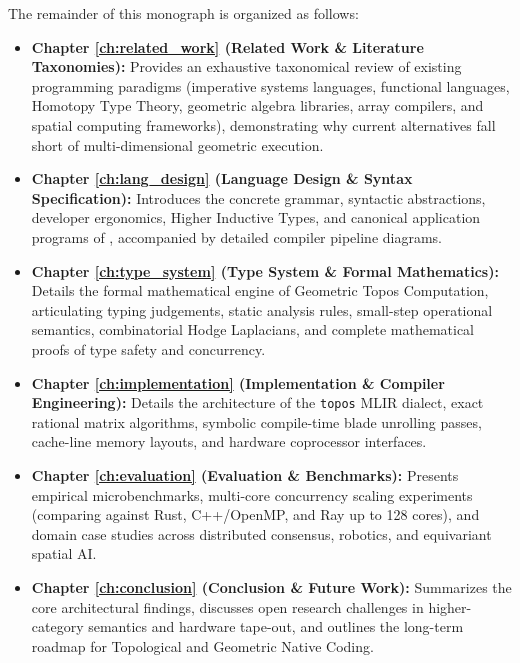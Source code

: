 The remainder of this monograph is organized as follows:
\begin{itemize}[leftmargin=1.5cm]
    \item \textbf{Chapter \ref{ch:related_work} (Related Work \& Literature Taxonomies):} Provides an exhaustive taxonomical review of existing programming paradigms (imperative systems languages, functional languages, Homotopy Type Theory, geometric algebra libraries, array compilers, and spatial computing frameworks), demonstrating why current alternatives fall short of multi-dimensional geometric execution.
    \item \textbf{Chapter \ref{ch:lang_design} (Language Design \& Syntax Specification):} Introduces the concrete grammar, syntactic abstractions, developer ergonomics, Higher Inductive Types, and canonical application programs of \ToposLang{}, accompanied by detailed compiler pipeline diagrams.
    \item \textbf{Chapter \ref{ch:type_system} (Type System \& Formal Mathematics):} Details the formal mathematical engine of Geometric Topos Computation, articulating typing judgements, static analysis rules, small-step operational semantics, combinatorial Hodge Laplacians, and complete mathematical proofs of type safety and concurrency.
    \item \textbf{Chapter \ref{ch:implementation} (Implementation \& Compiler Engineering):} Details the architecture of the \texttt{topos} MLIR dialect, exact rational matrix algorithms, symbolic compile-time blade unrolling passes, cache-line memory layouts, and hardware coprocessor interfaces.
    \item \textbf{Chapter \ref{ch:evaluation} (Evaluation \& Benchmarks):} Presents empirical microbenchmarks, multi-core concurrency scaling experiments (comparing \ToposLang{} against Rust, C++/OpenMP, and Ray up to 128 cores), and domain case studies across distributed consensus, robotics, and equivariant spatial AI.
    \item \textbf{Chapter \ref{ch:conclusion} (Conclusion \& Future Work):} Summarizes the core architectural findings, discusses open research challenges in higher-category semantics and hardware tape-out, and outlines the long-term roadmap for Topological and Geometric Native Coding.
\end{itemize}
